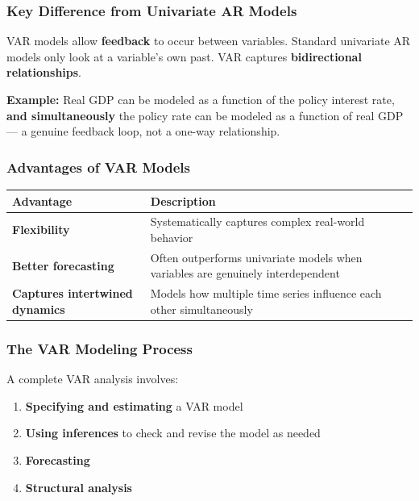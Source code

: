 \documentclass[12pt,openany]{book}
\begin{document}
\subsubsection{Key Difference from Univariate AR Models}

VAR models allow \textbf{feedback} to occur between variables. Standard univariate AR models only look at a variable's own past. VAR captures \textbf{bidirectional relationships}.

\textbf{Example:} Real GDP can be modeled as a function of the policy interest rate, \textbf{and simultaneously} the policy rate can be modeled as a function of real GDP --- a genuine feedback loop, not a one-way relationship.

\subsubsection{Advantages of VAR Models}

\begin{center}
\begin{tabular}{|L{0.28\textwidth}|L{0.62\textwidth}|}
\hline
Advantage & Description \\
\hline
\textbf{Flexibility} & Systematically captures complex real-world behavior \\
\hline
\textbf{Better forecasting} & Often outperforms univariate models when variables are genuinely interdependent \\
\hline
\textbf{Captures intertwined dynamics} & Models how multiple time series influence each other simultaneously \\
\hline
\end{tabular}
\end{center}

\subsubsection{The VAR Modeling Process}

A complete VAR analysis involves:

\begin{enumerate}[leftmargin=*]
    \item \textbf{Specifying and estimating} a VAR model
    \item \textbf{Using inferences} to check and revise the model as needed
    \item \textbf{Forecasting}
    \item \textbf{Structural analysis}
\end{enumerate}
\end{document}

